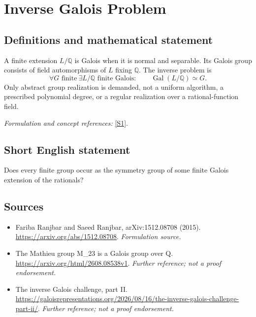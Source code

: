 \documentclass[11pt]{article}
\begin{document}
\section*{\texorpdfstring{Inverse Galois Problem}{Inverse Galois Problem}}\label{20}
\subsection{Definitions and mathematical statement}
A finite extension $L/{\mathbb{Q}}$ is Galois when it is normal and separable. Its Galois group consists of field automorphisms of $L$ fixing ${\mathbb{Q}}$. The inverse problem is
\[
 \forall G\text{ finite}\ \exists L/{\mathbb{Q}}\text{ finite Galois}:\qquad
 \operatorname{Gal}(L/{\mathbb{Q}})\simeq G.
\]
Only abstract group realization is demanded, not a uniform algorithm, a prescribed polynomial degree, or a regular realization over a rational-function field.
\par\smallskip\textit{Formulation and concept references:} \href{https://arxiv.org/abs/1512.08708}{[S1]}.

\subsection{Short English statement}
Does every finite group occur as the symmetry group of some finite Galois extension of the rationals?
\subsection{Sources}
\begin{itemize}
\item[S1]Fariba Ranjbar and Saeed Ranjbar, arXiv:1512.08708 (2015).
\url{https://arxiv.org/abs/1512.08708}.
\textit{Formulation source.}
\item[S2]The Mathieu group M\_23 is a Galois group over Q.
\url{https://arxiv.org/html/2608.08538v1}.
\textit{Further reference; not a proof endorsement.}
\item[S3]The inverse Galois challenge, part II.
\url{https://galoisrepresentations.org/2026/08/16/the-inverse-galois-challenge-part-ii/}.
\textit{Further reference; not a proof endorsement.}
\end{itemize}
\end{document}
